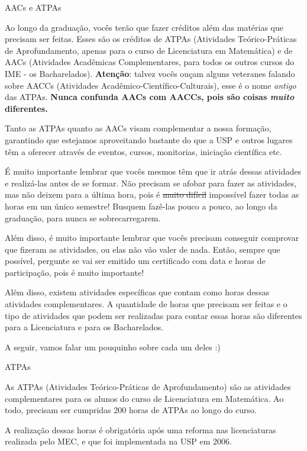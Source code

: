 \begin{secao}{AACs e ATPAs}

Ao longo da graduação, vocês terão que fazer créditos além das matérias
que precisam ser feitas. Esses são os créditos de ATPAs (Atividades
Teórico-Práticas de Aprofundamento, apenas para o curso de Licenciatura
em Matemática) e de AACs (Atividades Acadêmicas Complementares, para todos
os outros cursos do IME - os Bacharelados). \textbf{Atenção}: talvez vocês ouçam
alguns veteranes falando sobre AACCs (Atividades Acadêmico-Científico-Culturais),
esse é o nome \textit{antigo} das ATPAs.
\textbf{Nunca confunda AACs com AACCs, pois são coisas \textit{muito} diferentes.}

Tanto as ATPAs quanto as AACs visam complementar a nossa formação,
garantindo que estejamos aproveitando bastante do que a USP e outros
lugares têm a oferecer através de eventos, cursos, monitorias, iniciação
científica etc.

É muito importante lembrar que vocês mesmos têm que ir atrás dessas
atividades e realizá-las antes de se formar. Não precisam se afobar para
fazer as atividades, mas não deixem para a última hora, pois é
\sout{muito difícil} impossível fazer todas as horas em um único semestre!
Busquem fazê-las pouco a pouco, ao longo da graduação, para nunca se
sobrecarregarem.

Além disso, é muito importante lembrar que vocês precisam conseguir
comprovar que fizeram as atividades, ou elas não vão valer de nada.
Então, sempre que possível, pergunte se vai ser emitido um certificado
com data e horas de participação, pois é muito importante!

Além disso, existem atividades específicas que contam como horas
dessas atividades complementares. A quantidade de horas que precisam
ser feitas e o tipo de atividades que podem ser realizadas para contar
essas horas são diferentes para a Licenciatura e para os Bacharelados.

A seguir, vamos falar um pouquinho sobre cada um deles :)

\begin{subsecao}{ATPAs}

As ATPAs (Atividades Teórico-Práticas de Aprofundamento) são as
atividades complementares para os alunos do curso de Licenciatura em
Matemática. Ao todo, precisam ser cumpridas 200 horas de ATPAs ao longo do curso.

A realização dessas horas é obrigatória após uma reforma nas licenciaturas
realizada pelo MEC, e que foi implementada na USP em 2006.


\end{subsecao}
\end{secao}
